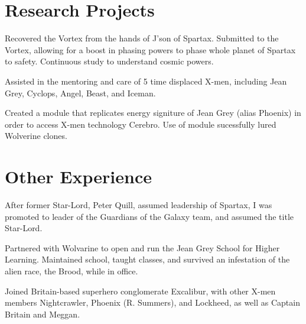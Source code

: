 \documentclass{mycv}
\begin{document}
\section{Research Projects}
\noindent Recovered the Vortex from the hands of J'son of Spartax. Submitted %
to the Vortex, allowing for a boost in phasing powers to phase whole planet %
of Spartax to safety. Continuous study to understand cosmic powers.

\vspace{5pt}

\noindent Assisted in the mentoring and care of 5 time displaced X-men, including %
Jean Grey, Cyclops, Angel, Beast, and Iceman. 

\vspace{5pt}

\noindent Created a module that replicates energy signiture of Jean Grey (alias Phoenix) %
in order to access X-men technology Cerebro. Use of module sucessfully %
lured Wolverine clones. 

\vspace{5pt}

\section{Other Experience}

\noindent After former Star-Lord, Peter Quill, assumed leadership of Spartax, I was%
promoted to leader of the Guardians of the Galaxy team, and assumed the title %
Star-Lord. 

\vspace{5pt}

\noindent Partnered with Wolvarine to open and run the Jean Grey School for %
Higher Learning. Maintained school, taught classes, and survived an %
infestation of the alien race, the Brood, while in office. 

\vspace{5pt}

\noindent Joined Britain-based superhero conglomerate Excalibur, with other %
X-men members Nightcrawler, Phoenix (R. Summers), and Lockheed, as well as %
Captain Britain and Meggan. 
\end{document}
